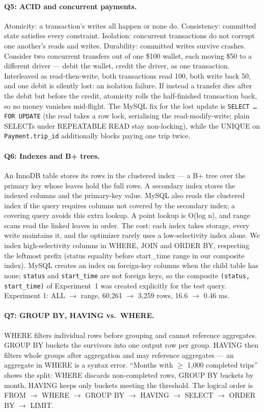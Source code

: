 \paragraph{Q5: ACID and concurrent payments.}
Atomicity: a transaction's writes all happen or none do. Consistency: committed state satisfies every constraint. Isolation: concurrent transactions do not corrupt one another's reads and writes. Durability: committed writes survive crashes. Consider two concurrent transfers out of one \$100 wallet, each moving \$50 to a different driver --- debit the wallet, credit the driver, as one transaction. Interleaved as read-then-write, both transactions read 100, both write back 50, and one debit is silently lost: an isolation failure. If instead a transfer dies after the debit but before the credit, atomicity rolls the half-finished transaction back, so no money vanishes mid-flight. The MySQL fix for the lost update is \texttt{SELECT \ldots FOR UPDATE} (the read takes a row lock, serialising the read-modify-write; plain SELECTs under REPEATABLE READ stay non-locking), while the UNIQUE on \texttt{Payment.trip\_id} additionally blocks paying one trip twice.

\paragraph{Q6: Indexes and B+ trees.}
An InnoDB table stores its rows in the clustered index --- a B+ tree over the primary key whose leaves hold the full rows. A secondary index stores the indexed columns and the primary-key value. MySQL also reads the clustered index if the query requires columns not covered by the secondary index; a covering query avoids this extra lookup. A point lookup is O(log n), and range scans read the linked leaves in order. The cost: each index takes storage, every write maintains it, and the optimizer rarely uses a low-selectivity index alone. We index high-selectivity columns in WHERE, JOIN and ORDER BY, respecting the leftmost prefix (status equality before start\_time range in our composite index). MySQL creates an index on foreign-key columns when the child table has none; \texttt{status} and \texttt{start\_time} are not foreign keys, so the composite \texttt{(status, start\_time)} of Experiment~1 was created explicitly for the test query. Experiment 1: ALL $\to$ range, 60{,}261 $\to$ 3{,}259 rows, 16.6 $\to$ 0.46 ms.

\paragraph{Q7: GROUP BY, HAVING vs.\ WHERE.}
WHERE filters individual rows before grouping and cannot reference aggregates. GROUP BY buckets the survivors into one output row per group. HAVING then filters whole groups after aggregation and may reference aggregates --- an aggregate in WHERE is a syntax error. ``Months with $\ge$ 1{,}000 completed trips'' shows the split: WHERE discards non-completed rows, GROUP BY buckets by month, HAVING keeps only buckets meeting the threshold. The logical order is FROM $\to$ WHERE $\to$ GROUP BY $\to$ HAVING $\to$ SELECT $\to$ ORDER BY $\to$ LIMIT.

